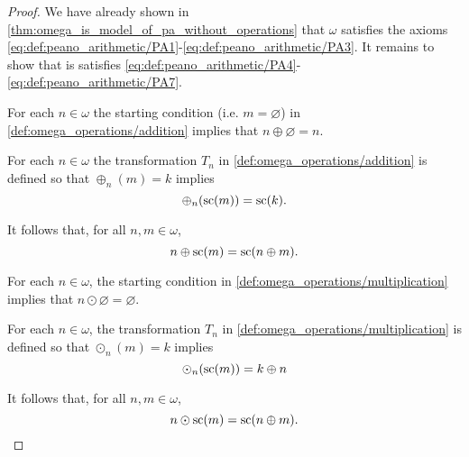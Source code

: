 \begin{proof}
  We have already shown in \cref{thm:omega_is_model_of_pa_without_operations} that \( \omega \) satisfies the axioms \eqref{eq:def:peano_arithmetic/PA1}-\eqref{eq:def:peano_arithmetic/PA3}. It remains to show that is satisfies \eqref{eq:def:peano_arithmetic/PA4}-\eqref{eq:def:peano_arithmetic/PA7}.

   For each \( n \in \omega \) the starting condition (i.e. \( m = \varnothing \)) in \cref{def:omega_operations/addition} implies that \( n \oplus \varnothing = n \).

   For each \( n \in \omega \) the transformation \( T_n \) in \cref{def:omega_operations/addition} is defined so that \( \oplus_n(m) = k \) implies
  \begin{equation*}
    \oplus_n(\op{sc}(m)) = \op{sc}(k).
  \end{equation*}

  It follows that, for all \( n, m \in \omega \),
  \begin{equation*}
    n \oplus \op{sc}(m) = \op{sc}(n \oplus m).
  \end{equation*}

   For each \( n \in \omega \), the starting condition in \cref{def:omega_operations/multiplication} implies that \( n \odot \varnothing = \varnothing \).

   For each \( n \in \omega \), the transformation \( T_n \) in \cref{def:omega_operations/multiplication} is defined so that \( \odot_n(m) = k \) implies
  \begin{equation*}
    \odot_n(\op{sc}(m)) = k \oplus n
  \end{equation*}

  It follows that, for all \( n, m \in \omega \),
  \begin{equation*}
    n \odot \op{sc}(m) = \op{sc}(n \oplus m).
  \end{equation*}
\end{proof}
